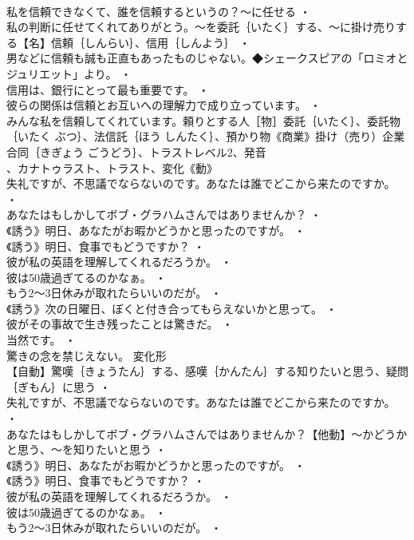 \documentclass[8pt]{extreport}
\begin{document}
\begin{CJK}{UTF8}{min}
\\	私を信頼できなくて、誰を信頼するというの？～に任せる ・
\\	私の判断に任せてくれてありがとう。～を委託｛いたく｝する、～に掛け売りする【名】信頼｛しんらい｝、信用｛しんよう｝ ・
\\	男などに信頼も誠も正直もあったものじゃない。◆シェークスピアの「ロミオとジュリエット」より。 ・
\\	信用は、銀行にとって最も重要です。 ・
\\	彼らの関係は信頼とお互いへの理解力で成り立っています。 ・
\\	みんな私を信頼してくれています。頼りとする人［物］委託｛いたく｝、委託物｛いたく ぶつ｝、法信託｛ほう しんたく｝、預かり物《商業》掛け（売り）企業合同｛きぎょう ごうどう｝、トラストレベル2、発音
\\	、カナトゥラスト、トラスト、変化《動》
\\	失礼ですが、不思議でならないのです。あなたは誰でどこから来たのですか。 ・
\\	あなたはもしかしてボブ・グラハムさんではありませんか？ ・
\\	《誘う》明日、あなたがお暇かどうかと思ったのですが。 ・
\\	《誘う》明日、食事でもどうですか？ ・
\\	彼が私の英語を理解してくれるだろうか。 ・
\\	彼は50歳過ぎてるのかなぁ。 ・
\\	もう2～3日休みが取れたらいいのだが。 ・
\\	《誘う》次の日曜日、ぼくと付き合ってもらえないかと思って。 ・
\\	彼がその事故で生き残ったことは驚きだ。 ・
\\	当然です。 ・
\\	驚きの念を禁じえない。	変化形 
\\	【自動】驚嘆｛きょうたん｝する、感嘆｛かんたん｝する知りたいと思う、疑問｛ぎもん｝に思う ・
\\	失礼ですが、不思議でならないのです。あなたは誰でどこから来たのですか。 ・
\\	あなたはもしかしてボブ・グラハムさんではありませんか？【他動】～かどうかと思う、～を知りたいと思う ・
\\	《誘う》明日、あなたがお暇かどうかと思ったのですが。 ・
\\	《誘う》明日、食事でもどうですか？ ・
\\	彼が私の英語を理解してくれるだろうか。 ・
\\	彼は50歳過ぎてるのかなぁ。 ・
\\	もう2～3日休みが取れたらいいのだが。 ・

\end{CJK}
\end{document}

